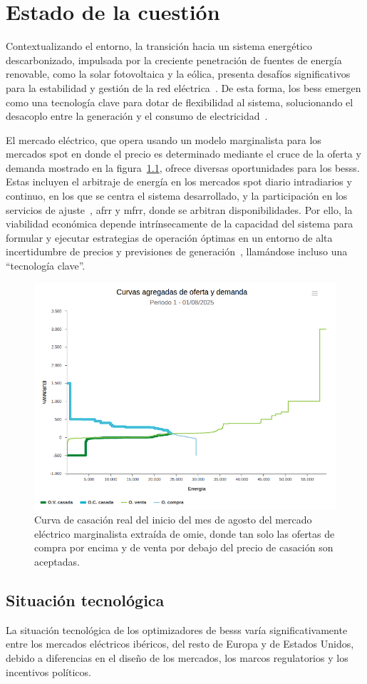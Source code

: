\cleardoublepage

\chapter{Estado de la cuestión}
\label{makereference2}


Contextualizando el entorno, la transición hacia un sistema energético descarbonizado, impulsada por la creciente penetración de fuentes de energía renovable, como la solar fotovoltaica y la eólica, presenta desafíos significativos para la estabilidad y gestión de la red eléctrica~\cite{carrasco2023battery}. De esta forma, los \gls{bess} emergen como una tecnología clave para dotar de flexibilidad al sistema, solucionando el desacoplo entre la generación y el consumo de electricidad~\cite{gissey2018market}.

El mercado eléctrico, que opera usando un modelo marginalista para los mercados spot en donde el precio es determinado mediante el cruce de la oferta y demanda mostrado en la figura~\ref{fig:precio-casacion}, ofrece diversas oportunidades para los \glspl{bess}. Estas incluyen el arbitraje de energía en los mercados spot diario intradiarios y continuo, en los que se centra el sistema desarrollado, y la participación en los servicios de ajuste~\cite{gaspar2021optimisation}, \gls{afrr} y \gls{mfrr}, donde se arbitran disponibilidades. Por ello, la viabilidad económica depende intrínsecamente de la capacidad del sistema para formular y ejecutar estrategias de operación óptimas en un entorno de alta incertidumbre de precios y previsiones de generación~\cite{heredia2015economic}, llamándose incluso una ``tecnología clave''.

\begin{figure}
  \centering
  \includegraphics[width=0.5\linewidth]{figures/precio-casacion.png}
  \caption{Curva de casación real del inicio del mes de agosto del mercado eléctrico marginalista extraída de \gls{omie}, donde tan solo las ofertas de compra por encima y de venta por debajo del precio de casación son aceptadas.}
  \label{fig:precio-casacion}
\end{figure}

\section{Situación tecnológica}

La situación tecnológica de los optimizadores de \glspl{bess} varía significativamente entre los mercados eléctricos ibéricos, del resto de Europa y de Estados Unidos, debido a diferencias en el diseño de los mercados, los marcos regulatorios y los incentivos políticos.
